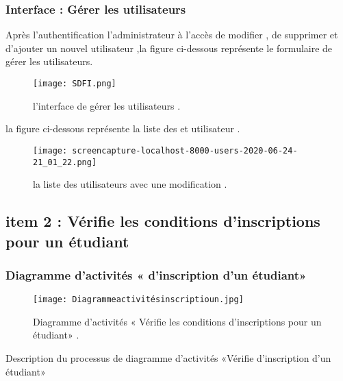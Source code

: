  \subsubsection{ Interface : Gérer les utilisateurs   }
 Après l'authentification l'administrateur  à l'accès  de modifier , de supprimer et d'ajouter un nouvel utilisateur ,la figure ci-dessous représente le formulaire de gérer les utilisateurs.
 \begin{figure}[ht]
 	\centering
 	\texttt{[image: SDFI.png]}
 	\caption{l'interface de gérer les utilisateurs .}
 	\label{fig:l'interface de gérer les utilisateurs    }
 \end{figure}
 \FloatBarrier
 la figure ci-dessous représente la liste des et utilisateur .
  \begin{figure}[ht]
 	\centering
 	\texttt{[image: screencapture-localhost-8000-users-2020-06-24-21\_01\_22.png]}
 	\caption{la liste des utilisateurs avec une modification .}
 	\label{fig:la liste des utilisateurs avec une modification  }
 \end{figure}
 \FloatBarrier
\clearpage
\subsection{item 2 : Vérifie les conditions d’inscriptions pour un étudiant}


\subsubsection{Diagramme d'activités « d'inscription d'un étudiant» }
\begin{figure}[ht]
	\centering
	\texttt{[image: Diagrammeactivitésinscriptioun.jpg]}
	\caption{Diagramme d'activités « Vérifie les conditions d’inscriptions pour un étudiant» .}
	\label{fig:Diagramme d' activités Vérifie d' inscription d'un étudiant   }
\end{figure}
\FloatBarrier
{\Large \color{cyan} Description du processus de diagramme d’activités «Vérifie d'inscription d'un étudiant»}


